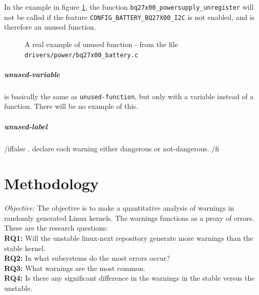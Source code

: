 \documentclass[a4paper,11pt]{report}
\newcommand{\figa}{
    \begin{figure}[!htpb]
    \centering
}
\newcommand{\figb}[2]{
    \caption{#1}
    \label{#2}
    \end{figure}
}
\begin{document}
In the example in figure \ref{lst:unusedfuncreal}, the function 
\texttt{bq27x00\_powersupply\_unregister} will not be called if the feature 
\texttt{CONFIG\_BATTERY\_BQ27X00\_I2C} is not enabled, and is therefore an 
unused function.

\figa
    
\figb{A real example of unused function - from the file 
    \texttt{drivers/power/bq27x00\_battery.c}}{lst:unusedfuncreal}


            \paragraph{unused-variable}
is basically the same as \texttt{unused-function}, but only with a variable 
instead of a function. There will be no example of this.


            \paragraph{unused-label}


/iffalse
 .  declare each warning either dangerous or not-dangerous.
/fi


\newpage
\chapter{Methodology}

\emph{Objective:}
The objective is to make a quantitative analysis of warnings in randomly 
generated Linux kernels. The warnings functions as a proxy of errors.
These are the research questions:
\\

\textbf{RQ1:} Will the unstable linux-next repository generate more warnings 
than the stable kernel.
\\

\textbf{RQ2:} In what subsystems do the most errors occur?
\\

\textbf{RQ3:} What warnings are the most common.
\\

\textbf{RQ4:} Is there any significant difference in the warnings in the 
stable versus the unstable.
\\
\end{document}

